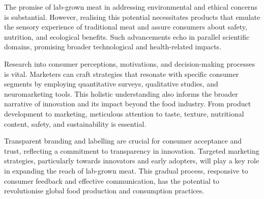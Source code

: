 \documentclass[10pt]{article}
\begin{document}
\begin{sloppypar}
  The promise of lab-grown meat in addressing environmental and ethical concerns is substantial. However, realising this potential necessitates products that emulate the sensory experience of traditional meat and assure consumers about safety, nutrition, and ecological benefits. Such advancements echo in parallel scientific domains, promising broader technological and health-related impacts.

  Research into consumer perceptions, motivations, and decision-making processes is vital. Marketers can craft strategies that resonate with specific consumer segments by employing quantitative surveys, qualitative studies, and neuromarketing tools. This holistic understanding also informs the broader narrative of innovation and its impact beyond the food industry. From product development to marketing, meticulous attention to taste, texture, nutritional content, safety, and sustainability is essential.

  Transparent branding and labelling are crucial for consumer acceptance and trust, reflecting a commitment to transparency in innovation. Targeted marketing strategies, particularly towards innovators and early adopters, will play a key role in expanding the reach of lab-grown meat. This gradual process, responsive to consumer feedback and effective communication, has the potential to revolutionise global food production and consumption practices.

  \pagebreak
  \singlespacing %
  
  

\end{sloppypar}
\end{document}
